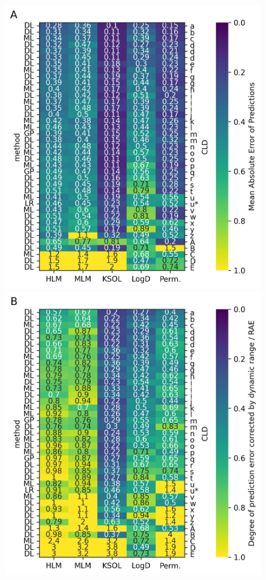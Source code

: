 \documentclass[journal=jcim,manuscript=article]{achemso}
\begin{document}
{\begin{figure}
    \includegraphics[scale=0.6]{fig5_admet_leaderboard/Figure_PanelA.png}
    \includegraphics[scale=0.6]{fig5_admet_leaderboard/Figure_PanelB.png}

\end{figure}}
\end{document}
